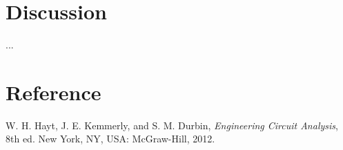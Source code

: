 \documentclass[12pt,a4paper]{article}
\begin{document}
\section{Discussion}
...

\section{Reference}
\begin{enumerate}[label={[\arabic*]}, leftmargin=2.5em]
  \item W. H. Hayt, J. E. Kemmerly, and S. M. Durbin, \textit{Engineering
        Circuit Analysis}, 8th ed. New York, NY, USA: McGraw-Hill, 2012.
\end{enumerate}
\end{document}
